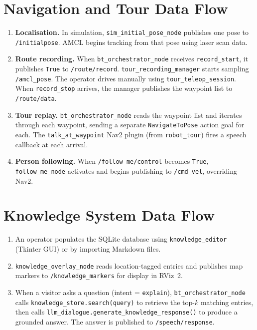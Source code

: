 \documentclass[12pt,a4paper]{report}
\newcommand{\pkg}[1]{\texttt{\color{RoyalBlue}#1}}
\newcommand{\topic}[1]{\texttt{\color{purple!80!black}#1}}
\newcommand{\node}[1]{\texttt{\color{Maroon}#1}}
\begin{document}
\section{Navigation and Tour Data Flow}
\label{sec:nav_flow}

\begin{enumerate}[leftmargin=2em]
  \item \textbf{Localisation.}
    In simulation, \node{sim\_initial\_pose\_node} publishes one pose to
    \topic{/initialpose}.  AMCL begins tracking from that pose using laser
    scan data.

  \item \textbf{Route recording.}
    When \node{bt\_orchestrator\_node} receives \texttt{record\_start},
    it publishes \texttt{True} to \topic{/route/record}.
    \node{tour\_recording\_manager} starts sampling \topic{/amcl\_pose}.
    The operator drives manually using \node{tour\_teleop\_session}.
    When \texttt{record\_stop} arrives, the manager publishes the waypoint
    list to \topic{/route/data}.

  \item \textbf{Tour replay.}
    \node{bt\_orchestrator\_node} reads the waypoint list and iterates
    through each waypoint, sending a separate \texttt{NavigateToPose}
    action goal for each.  The \node{talk\_at\_waypoint} Nav2 plugin
    (from \pkg{robot\_tour}) fires a speech callback at each arrival.

  \item \textbf{Person following.}
    When \topic{/follow\_me/control} becomes \texttt{True},
    \node{follow\_me\_node} activates and begins publishing to
    \topic{/cmd\_vel}, overriding Nav2.
\end{enumerate}

\section{Knowledge System Data Flow}
\label{sec:know_flow}

\begin{enumerate}[leftmargin=2em]
  \item An operator populates the SQLite database using
        \node{knowledge\_editor} (Tkinter GUI) or by importing Markdown
        files.

  \item \node{knowledge\_overlay\_node} reads location-tagged entries and
        publishes map markers to \topic{/knowledge\_markers} for display
        in RViz~2.

  \item When a visitor asks a question (intent = \texttt{explain}),
        \node{bt\_orchestrator\_node} calls
        \texttt{knowledge\_store.search(query)} to retrieve the top-$k$
        matching entries, then calls
        \texttt{llm\_dialogue.generate\_knowledge\_response()} to produce
        a grounded answer.  The answer is published to
        \topic{/speech/response}.
\end{enumerate}
\end{document}

